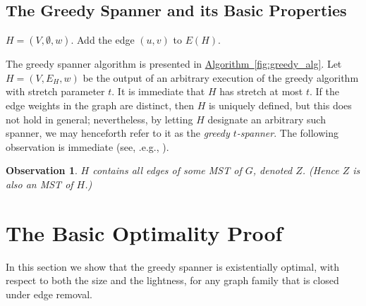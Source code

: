 \documentclass[11pt,letterpaper]{article}
\newtheorem{observation}[lemma]{Observation}
\newcommand{\namedref}[2]{\hyperref[#2]{#1~\ref*{#2}}}
\newcommand{\algref}[1]{\namedref{Algorithm}{#1}}
\begin{document}
\subsection{The Greedy Spanner and its Basic Properties}
\begin{algorithm}
	\caption{$\texttt{Greedy}(G=(V,E,w),t)$}\label{fig:greedy_alg}
	\begin{algorithmic}[1]
		\STATE $H=(V,\emptyset,w)$.
		\STATE Add the edge $(u,v)$ to $E(H)$.
		\ENDIF
		\ENDFOR
	\end{algorithmic}
\end{algorithm}
The greedy spanner algorithm is presented in \algref{fig:greedy_alg}.
Let $H=\left(V,E_{H},w\right)$ be the output of an arbitrary execution of the greedy algorithm with stretch parameter $t$.
It is immediate that $H$ has stretch at most $t$.
If the edge weights in the graph are distinct, then $H$ is uniquely defined, but this does not hold in general;
nevertheless, by letting $H$ designate an arbitrary such spanner, we may henceforth refer to it as the \emph{greedy $t$-spanner}.
The following observation is immediate (see, .e.g., \cite{ENS14,CW18}).
\begin{observation}
	\label{fct:greedy contains MST}
	$H$ contains all   edges of some MST of $G$, denoted $Z$. (Hence $Z$ is also an MST of $H$.)
\end{observation}



\section{The Basic Optimality Proof}\label{sec:Greedy_optimal}
In this section we show that the greedy spanner is existentially optimal, with respect to both the size and the lightness, for any graph family that is closed under edge removal.
\end{document}
